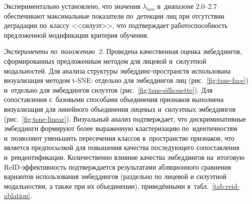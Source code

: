 Экспериментально установлено, что значения $\lambda_{\text{face}}$
в~диапазоне 2.0--2.7 обеспечивают максимальные показатели по~детекции лиц
при отсутствии деградации по~классу <<силуэт>>, что подтверждает
работоспособность предложенной модификации критерия обучения.

\textit{Эксперименты по~положению~2.} Проведена качественная оценка
эмбеддингов, сформированных предложенным методом для лицевой и~силуэтной
модальностей. Для анализа структуры эмбеддинг‑пространств использована
визуализация методом t‑SNE: отдельно для эмбеддингов лиц (рис.~\ref{fig:tsne-face})
и~отдельно для эмбеддингов силуэтов (рис.~\ref{fig:tsne-silhouette}).
Для сопоставления с~базовыми способами объединения признаков выполнена
визуализация для линейного объединения лицевых и~силуэтных эмбеддингов
(рис.~\ref{fig:tsne-linear}). Визуальный анализ подтверждает, что
дискриминативные эмбеддинги формируют более выраженную кластеризацию
по~идентичностям и~позволяют уменьшить пересечения классов в~пространстве
признаков, что является предпосылкой для повышения качества последующего
сопоставления и~реидентификации. Количественно влияние качества эмбеддингов
на~итоговую ReID‑эффективность подтверждается результатами абляционного сравнения вариантов использования эмбеддингов
(раздельно по лицевой и силуэтной модальностям, а также при их объединении),
приведёнными в~табл.~\ref{tab:reid-ablation}.

\begin{table}[H]
\centering
\caption{Абляционное сравнение вариантов использования эмбеддингов лица и~силуэта
(закрытая многоклассовая идентификация, Top-1; значения приведены в~долях единицы)}
\label{tab:reid-ablation}
\end{table}


